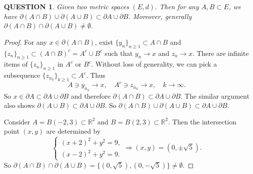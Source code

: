 \documentclass[12pt]{article}
\renewcommand{\(}{\left(}%
\renewcommand{\)}{\right)}%
\renewcommand{\[}{\left[}%
\renewcommand{\]}{\right]}%
\renewcommand{\r}{\mathbb{R}}
\newtheorem{question}{QUESTION}[section]}
\newtheorem{proof}{Proof.}}
\begin{document}
  \begin{question}
  	Given two metric spaces $(E,d)$. Then for any $A,B\subset E$, we have $\partial(A\cap B)\cup \partial(A\cup B)\subset \partial A\cup\partial B$. Moreover, generally $\partial(A\cap B)\cap \partial(A\cup B)\neq \emptyset$.
  \end{question}
  \begin{proof}
  	For any $x\in \partial(A\cap B)$, exist $\{y_n\}_{n\geq 1}\subset A\cap B$ and $\{z_n\}_{n\geq 1}\subset (A\cap B)^c=A^c\cup B^c$ such that $y_n\to x$ and $z_n\to x$. There are infinite items of $\{z_n\}_{n\geq 1}$ in $A^c$ or $B^c$. Without loss of generality, we can pick a subsequence $\{z_{n_k}\}_{k\geq 1}\subset A^c$. Thus 
  	\begin{equation*}
  		A\ni y_{n_k}\to x,\quad A^c\ni z_{n_k}\to x,\quad k\to\infty.
  	\end{equation*} 
  	So $x\in \partial A\subset \partial A\cup\partial B$ and therefore $\partial(A\cap B)\subset \partial A\cup\partial B$. The similar argument also shows $\partial(A\cup B)\subset \partial A\cup\partial B$. So $\partial(A\cap B)\cup \partial(A\cup B)\subset \partial A\cup\partial B$.
  	
  	Consider $A=B(-2,3)\subset\r^2$ and $B=B(2,3)\subset\r^2$. Then the intersection point $(x,y)$ are determined by
  	\begin{equation*}
  		\left\{
  		\begin{split}
  			(x+2)^2+y^2=9,\\
  			(x-2)^2+y^2=9.
  		\end{split}\right.
  		\Longrightarrow (x,y)=(0,\pm\sqrt{5}).
  	\end{equation*}
  	So $\partial(A\cap B)\cap \partial(A\cup B)=\{(0,\sqrt{5}),(0,-\sqrt{5})\}\neq \emptyset$.
  \end{proof}
  
\end{document}
